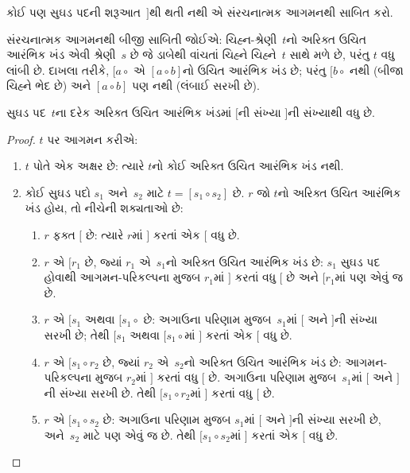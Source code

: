 \documentclass[../../../include/open-logic-section]{subfiles}
\begin{document}
\begin{prob}
  કોઈ પણ સુઘડ પદની શરૂઆત~$]$થી થતી નથી
  એ સંરચનાત્મક આગમનથી સાબિત કરો.
\end{prob}

સંરચનાત્મક આગમનથી બીજી સાબિતી જોઈએ:
ચિહ્ન-શ્રેણી~$t$નો અરિક્ત ઉચિત આરંભિક ખંડ
એવી શ્રેણી~$s$ છે જે ડાબેથી વાંચતાં ચિહ્ને
ચિહ્ને~$t$ સાથે મળે છે, પરંતુ $t$ વધુ લાંબી
છે. દાખલા તરીકે, $[a \circ {}$ એ
$[a \circ b]$નો ઉચિત આરંભિક ખંડ છે; પરંતુ
$[b \circ {}$ નથી (બીજા ચિહ્ને ભેદ છે)
અને $[a \circ b]$ પણ નથી (લંબાઈ સરખી છે).

\begin{prop}
  સુઘડ પદ~$t$ના દરેક અરિક્ત ઉચિત આરંભિક ખંડમાં
  $[$ની સંખ્યા $]$ની સંખ્યાથી વધુ છે.
\end{prop}

\begin{proof}
  $t$ પર આગમન કરીએ:
  \begin{enumerate}
  \item $t$ પોતે એક અક્ષર છે: ત્યારે $t$નો
    કોઈ અરિક્ત ઉચિત આરંભિક ખંડ નથી.
  \item કોઈ સુઘડ પદો $s_1$ અને~$s_2$ માટે
    $t = [s_1 \circ s_2]$ છે. $r$ જો $t$નો
    અરિક્ત ઉચિત આરંભિક ખંડ હોય, તો નીચેની
    શક્યતાઓ છે:
    \begin{enumerate}
    \item $r$ ફક્ત $[$ છે: ત્યારે $r$માં
      $]$ કરતાં એક $[$ વધુ છે.
    \item $r$ એ $[r_1$ છે, જ્યાં $r_1$ એ~$s_1$નો
      અરિક્ત ઉચિત આરંભિક ખંડ છે: $s_1$ સુઘડ પદ
      હોવાથી આગમન-પરિકલ્પના મુજબ $r_1$માં
      $]$ કરતાં વધુ $[$ છે અને $[r_1$માં
      પણ એવું જ છે.
    \item $r$ એ $[s_1$ અથવા $[s_1 \circ {}$
      છે: અગાઉના પરિણામ મુજબ~$s_1$માં $[$
      અને $]$ની સંખ્યા સરખી છે; તેથી
      $[s_1$ અથવા $[s_1 \circ {}$માં
      $]$ કરતાં એક $[$ વધુ છે.
    \item $r$ એ $[s_1 \circ r_2$ છે, જ્યાં
      $r_2$ એ~$s_2$નો અરિક્ત ઉચિત આરંભિક ખંડ છે:
      આગમન-પરિકલ્પના મુજબ $r_2$માં $]$
      કરતાં વધુ $[$ છે. અગાઉના પરિણામ
      મુજબ~$s_1$માં $[$ અને $]$ની સંખ્યા
      સરખી છે. તેથી $[s_1 \circ r_2$માં
      $]$ કરતાં વધુ $[$ છે.
    \item $r$ એ $[s_1 \circ s_2$ છે:
      અગાઉના પરિણામ મુજબ $s_1$માં $[$
      અને $]$ની સંખ્યા સરખી છે, અને~$s_2$
      માટે પણ એવું જ છે. તેથી
      $[s_1 \circ s_2$માં $]$ કરતાં એક
      $[$ વધુ છે.
    \end{enumerate}
  \end{enumerate}
\end{proof}
\end{document}

